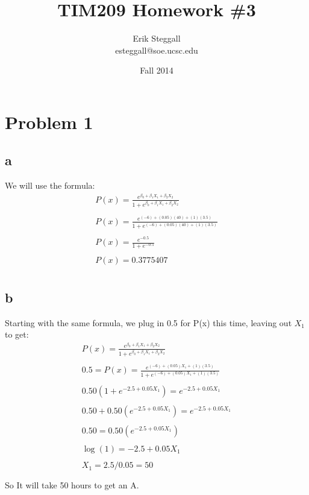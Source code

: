 \documentclass{article}
\title{TIM209 Homework \#3}
\author{Erik Steggall \\ esteggall@soe.ucsc.edu}
\date{Fall 2014}
\begin{document}
 \maketitle \pagestyle{empty}
\section*{Problem 1}
\subsection*{a}
We will use the formula:\\
\begin{align}
P(x) =\frac{ e^{\beta_{0}+\beta_{1}X_{1}+\beta_{2}X_{2}}}{1 + e^{\beta_{0}+\beta_{1}X_{1}+\beta_{2}X_{2}}}\\\\
P(x) =\frac{ e^{(-6)+(0.05)(40)+(1)(3.5)}}{1 + e^{(-6)+(0.05)(40)+(1)(3.5)}}\\\\
P(x) =\frac{ e^{-0.5}}{1 + e^{-0.5}}\\\\
P(x) = 0.3775407\\
\end{align}
\subsection*{b}
Starting with the same formula, we plug in 0.5 for P(x) this time, leaving out $X_{1}$ to get:\\
\begin{align}
P(x) =\frac{ e^{\beta_{0}+\beta_{1}X_{1}+\beta_{2}X_{2}}}{1 + e^{\beta_{0}+\beta_{1}X_{1}+\beta_{2}X_{2}}}\\\\
0.5 = P(x) =\frac{ e^{(-6)+(0.05)X_{1}+(1)(3.5)}}{1 + e^{(-6)+(0.05)X_{1}+(1)(3.5)}}\\\\
0.50 (1 + e^{-2.5 + 0.05 X_1}) = e^{-2.5 + 0.05 X_1} \\ \\
0.50 + 0.50(e^{-2.5 + 0.05 X_1}) = e^{-2.5 + 0.05 X_1}\\\\
0.50 = 0.50(e^{-2.5 + 0.05 X_1}) \\\\
\log(1) = -2.5 + 0.05 X_1\\\\
X_1 = 2.5 / 0.05 = 50\\\\
\end{align}
So It will take 50 hours to get an A.\\
\end{document}
